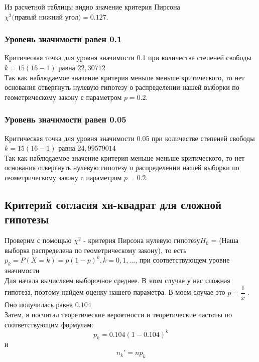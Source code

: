 \documentclass[a4paper,12pt, oneside]{book}
\begin{document}
\newpage
Из расчетной таблицы видно значение критерия Пирсона $ \chi^2 \text{(правый нижний угол)} = 0.127$. 

\subsubsection{Уровень значимости равен 0.1}

Критическая точка для уровня значимости 0.1 при количестве степеней свободы $ k = 15(16 - 1) $ равна $22,30712$\\

Так как наблюдаемое значение критерия меньше меньше критического, то нет основания отвергнуть нулевую гипотезу о распределении нашей выборки по геометрическому закону с параметром $ p = 0.2 $.  



\subsubsection{Уровень значимости равен 0.05} 

Критическая точка для уровня значимости 0.05 при количестве степеней свободы $ k = 15(16 - 1) $ равна $24,99579014$\\

Так как наблюдаемое значение критерия меньше меньше критического, то нет основания отвергнуть нулевую гипотезу о распределении нашей выборки по геометрическому закону c параметром $ p = 0.2 $.  


\newpage
\subsection{Критерий согласия хи-квадрат для сложной гипотезы}

Проверим с помощью $ \chi^2 $  - критерия Пирсона нулевую гипотезу$ H_0 $ = (Наша выборка распределена по геометрическому закону), то есть $ p_k = P(X = k ) = p (1-p)^k, k = 0,1, \ldots $, при соответствующем уровне значимости\\ 


Для начала вычисляем выборочное среднее. В этом случае у нас сложная гипотеза, поэтому найдем оценку нашего параметра. В моем случае это $ p = \dfrac{1}{\overline{x}} $ . Оно получилась равна $ 0.104 $\\

Затем, я посчитал теоретические вероятности и теоретические частоты по соответствующим  формулам:\\
$$ 
p_k = 0.104 (1 - 0.104)^k 
$$
и
$$
n_k' = n p_k
$$  
\end{document}
